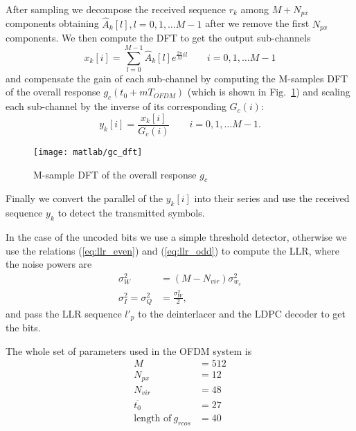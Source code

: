 \documentclass[a4paper,oneside]{article}
\begin{document}
After sampling we decompose the received sequence $r_k$ among $M+N_{px}$ components obtaining $\hat{A}_k[l], l = 0,1,\dots M-1$ after we remove the first $N_{px}$ components. We then compute the DFT to get the output sub-channels
\begin{equation}
  x_k[i] = \sum_{l=0}^{M-1}\hat{A}_k[l]e^{\frac{2\pi}{M}il} \qquad i=0,1,\dots M-1
\end{equation}
and compensate the gain of each sub-channel by computing the M-samples
DFT of the overall response $g_c(t_0 + mT_{OFDM})$ (which is shown in
Fig.~\ref{plot:gc_dft}) and scaling each sub-channel by the inverse of
its corresponding $G_c(i)$:
\begin{equation}
  y_k[i] = \frac{x_k[i]}{G_c(i)} \qquad i=0,1,\dots M-1 .
\end{equation}
\begin{figure}[htbp]
  \centering
  \texttt{[image: matlab/gc\_dft]}
  \caption{M-sample DFT of the overall response $g_c$}
  \label{plot:gc_dft}
\end{figure}

Finally we convert the parallel of the $y_k[i]$ into their series and use the received sequence $y_k$ to detect the transmitted symbols.

In the case of the uncoded bits we use a simple threshold detector,
otherwise we use the relations (\ref{eq:llr_even}) and
(\ref{eq:llr_odd}) to compute the LLR, where the noise powers are
\begin{align}
  \sigma_W^2 &= (M-N_{vir})\sigma^2_{w_c} \\
  \sigma^2_I = \sigma^2_Q &= \frac{\sigma_W^2}{2} ,
\end{align}
and pass the LLR sequence $l'_p$ to the deinterlacer and the LDPC
decoder to get the bits.

The whole set of parameters used in the OFDM system is
\begin{align}
  M &= 512 \\
    N_{px} &= 12 \\
    N_{vir} &= 48 \\
    \overline{t_0} &= 27 \\
    \text{length of} \  g_{rcos} &= 40
\end{align}
\end{document}
